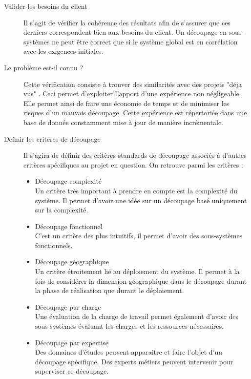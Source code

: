 \begin{description}
\item[Valider les besoins du client]
Il s'agit de vérifier la cohérence des résultats afin de s'assurer que ces derniers correspondent bien aux besoins du client. Un découpage en
sous-systèmes ne peut être correct que si le système global est en corrélation avec les exigences initiales. 
\item[Le problème est-il connu ?] Cette vérification consiste à trouver des similarités avec des projets "déja vus" . Ceci permet d'exploiter l'apport d'une expérience non négligeable.
Elle permet ainsi de faire une économie de temps et de minimiser les risques d'un mauvais découpage. Cette expérience est répertoriée dans une base de donnée constamment mise à jour de manière incrémentale.
\item[Définir les critères de découpage]
Il s'agira de définir des critères standards de découpage associés à d'autres critères spécifiques au projet en question. On retrouve parmi les critères :\\
\begin{itemize}
\item Découpage complexité \\ Un critère très important à prendre en compte est la complexité du système. Il permet d'avoir une idée sur un découpage basé uniquement sur la complexité.\\
\item Découpage fonctionnel \\ C'est un critère des plus intuitifs, il permet d'avoir des sous-systèmes fonctionnels.\\
\item Découpage géographique \\ Un critère étroitement lié au déploiement du système. Il permet à la fois de considérer la dimension géographique dans le découpage durant la phase de réalisation que durant le déploiement. \\
\item Découpage par charge \\ Une évaluation de la charge de travail permet également d'avoir des sous-systèmes évaluant les charges et les ressources nécessaires. \\
\item Découpage par expertise \\ Des domaines d'études peuvent apparaitre et faire l'objet d'un découpage spécifique. Des experts métiers peuvent intervenir pour superviser ce découpage.\\

\end{itemize}
\end{description}
